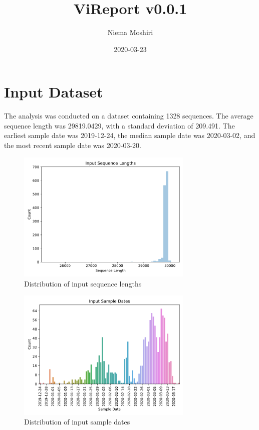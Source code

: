 \documentclass{article}
\title{\vspace{-2.0cm}ViReport v0.0.1}
\author{Niema Moshiri}
\date{2020-03-23}
\begin{document}
\maketitle

\section{Input Dataset}
The analysis was conducted on a dataset containing 1328 sequences. The average sequence length was 29819.0429, with a standard deviation of 209.491. The earliest sample date was 2019-12-24, the median sample date was 2020-03-02, and the most recent sample date was 2020-03-20.

\begin{figure}[h]
\centering
\includegraphics[width=0.75\textwidth,keepaspectratio]{./figs/input_sequence_lengths.pdf}
\caption{Distribution of input sequence lengths}
\end{figure}



\begin{figure}[h]
\centering
\includegraphics[width=0.75\textwidth,keepaspectratio]{./figs/input_sample_dates.pdf}
\caption{Distribution of input sample dates}
\end{figure}
\end{document}
